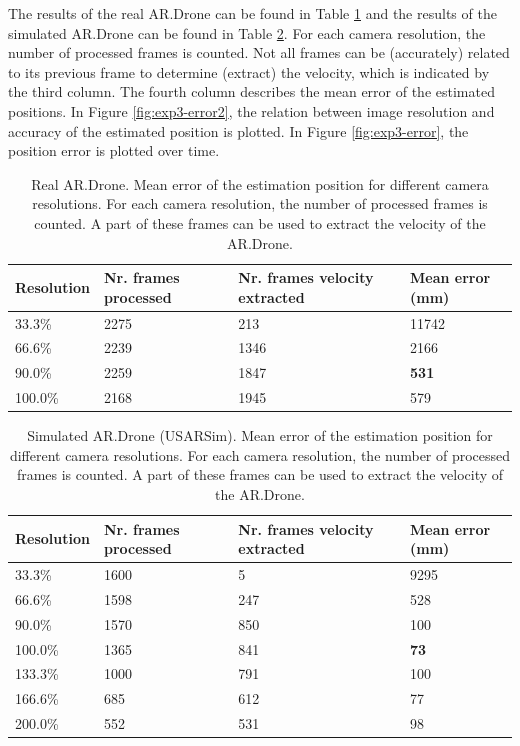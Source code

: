 The results of the real AR.Drone can be found in Table \ref{tab:res-resolution-ar} and the results of the simulated AR.Drone can be found in Table \ref{tab:res-resolution-usar}.
For each camera resolution, the number of processed frames is counted.
Not all frames can be (accurately) related to its previous frame to determine (extract) the velocity, which is indicated by the third column.
The fourth column describes the mean error of the estimated positions.
In Figure \ref{fig:exp3-error2}, the relation between image resolution and accuracy of the estimated position is plotted.
In Figure \ref{fig:exp3-error}, the position error is plotted over time.


\begin{table}[htb!]
    \centering
    \begin{tabular}
        { | l | l | l | l | } 
	\hline
	Resolution & Nr. frames processed & Nr. frames velocity extracted & Mean error (mm) \\
        \hline
        33.3\% & 2275 & 213 & 11742 \\
	66.6\% & 2239 & 1346 & 2166 \\
	90.0\% & 2259 & 1847 & \textbf{531} \\
	100.0\% & 2168 & 1945 & 579 \\
	\hline
    \end{tabular}
    \caption{Real AR.Drone. Mean error of the estimation position for different camera resolutions. For each camera resolution, the number of processed frames is counted. A part of these frames can be used to extract the velocity of the AR.Drone.}
    \label{tab:res-resolution-ar}
\end{table}

\begin{table}[htb!]
    \centering
    \begin{tabular}
        { | l | l | l | l | } 
	\hline
	Resolution & Nr. frames processed & Nr. frames velocity extracted & Mean error (mm) \\
        \hline
        33.3\% & 1600 & 5 & 9295 \\
	66.6\% & 1598 & 247 & 528 \\
	90.0\% & 1570 & 850 & 100 \\
	100.0\% & 1365 & 841 & \textbf{73} \\
	133.3\% & 1000 & 791 & 100 \\
	166.6\% & 685 & 612 & 77 \\
	200.0\% & 552 & 531 & 98 \\
	\hline
    \end{tabular}
    \caption{Simulated AR.Drone (USARSim). Mean error of the estimation position for different camera resolutions. For each camera resolution, the number of processed frames is counted. A part of these frames can be used to extract the velocity of the AR.Drone.}
    \label{tab:res-resolution-usar}
\end{table}


